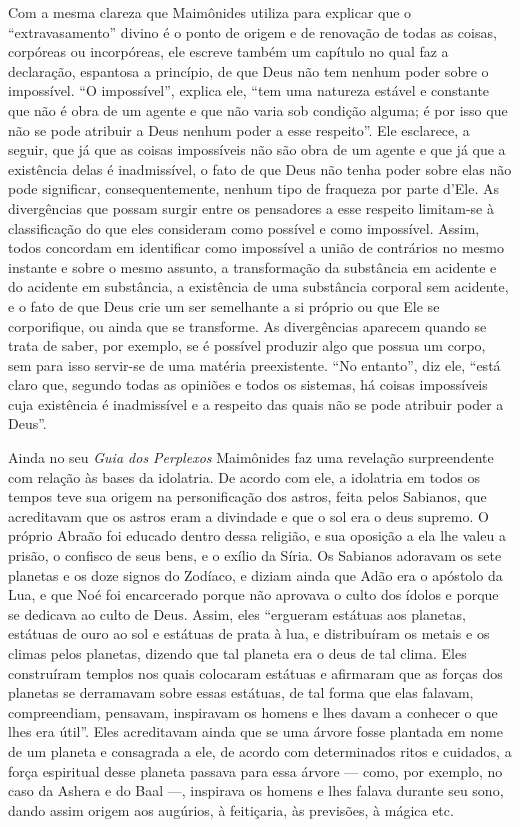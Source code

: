 Com a mesma clareza que Maimônides utiliza para explicar que o
``extravasamento'' divino é o ponto de origem e de renovação de todas
as coisas, corpóreas ou incorpóreas, ele escreve também um capítulo no
qual faz a declaração, espantosa a princípio, de que Deus não tem nenhum poder sobre
o impossível. ``O impossível'', explica ele, ``tem uma natureza estável
e constante que não é obra de um agente e que não varia sob condição
alguma; é por isso que não se pode atribuir a Deus nenhum poder a esse
respeito''. Ele esclarece, a seguir, que já que as coisas impossíveis
não são obra de um agente e que já que a existência delas é
inadmissível, o fato de que Deus não tenha poder sobre elas não pode
significar, consequentemente, nenhum tipo de fraqueza por parte d'Ele.
As divergências que possam surgir entre os pensadores a esse respeito
limitam-se à classificação do que eles consideram como possível e como
impossível. Assim, todos concordam em identificar como impossível a
união de contrários no mesmo instante e sobre o mesmo assunto, a
transformação da substância em acidente e do acidente em substância, a
existência de uma substância corporal sem acidente, e o fato de que Deus
crie um ser semelhante a si próprio ou que Ele se corporifique, ou
ainda que se transforme. As divergências aparecem quando se trata de
saber, por exemplo, se é possível produzir algo que possua um corpo,
sem para isso servir-se de uma matéria preexistente. ``No entanto'',
diz ele, ``está claro que, segundo todas as opiniões e todos os
sistemas, há coisas impossíveis cuja existência é inadmissível e a
respeito das quais não se pode atribuir poder a Deus''.

Ainda no seu \emph{Guia dos Perplexos} Maimônides faz uma revelação
surpreendente com relação às bases da idolatria. De acordo com ele, a
idolatria em todos os tempos teve sua origem na personificação dos
astros, feita pelos Sabianos, que acreditavam que os astros eram a
divindade e que o sol era o deus supremo. O próprio Abraão foi educado
dentro dessa religião, e sua oposição a ela lhe valeu a prisão, o
confisco de seus bens, e o exílio da Síria. Os Sabianos adoravam os sete
planetas e os doze signos do Zodíaco, e diziam ainda que Adão era o
apóstolo da Lua, e que Noé foi encarcerado porque não aprovava o culto
dos ídolos e porque se dedicava ao culto de Deus. Assim, eles
``ergueram estátuas aos planetas, estátuas de ouro ao sol e estátuas de
prata à lua, e distribuíram os metais e os climas pelos planetas,
dizendo que tal planeta era o deus de tal clima. Eles construíram
templos nos quais colocaram estátuas e afirmaram que as forças dos
planetas se derramavam sobre essas estátuas, de tal forma que elas
falavam, compreendiam, pensavam, inspiravam os homens e lhes davam a
conhecer o que lhes era útil''. Eles acreditavam ainda que se uma árvore
fosse plantada em nome de um planeta e consagrada a ele, de acordo com
determinados ritos e cuidados, a força espiritual desse planeta passava
para essa árvore --- como, por exemplo, no caso da Ashera e do Baal ---,
inspirava os homens e lhes falava durante seu sono, dando assim origem
aos augúrios, à feitiçaria, às previsões, à mágica etc.

